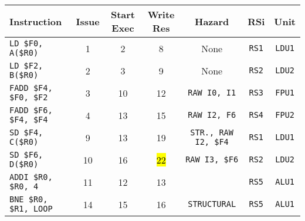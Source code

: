 \begin{enumerate}
    \begin{table}[!htp]
        \centering
        \begin{adjustbox}{width={\textwidth},totalheight={\textheight},keepaspectratio}
        \begin{tabular}{@{} l c c c c c c @{}}
            \toprule
            \textbf{Instruction} & \textbf{Issue} & \textbf{Start Exec} & \textbf{Write Res} & \textbf{Hazard} & \textbf{RSi} & \textbf{Unit} \\
            \midrule
            \texttt{LD \$F0, A(\$R0)}       & 1 & 2 & 8 & None  & \texttt{RS1}   & \texttt{LDU1}  \\ [.5em]
            \texttt{LD \$F2, B(\$R0)}       & 2 & 3 & 9 & None  & \texttt{RS2}   & \texttt{LDU2}  \\ [.5em]
            \texttt{FADD \$F4, \$F0, \$F2}  & 3 & 10 & 12 & \texttt{RAW I0, I1} & \texttt{RS3} & \texttt{FPU1} \\ [.5em]
            \texttt{FADD \$F6, \$F4, \$F4}  & 4 & 13 & 15 & \texttt{RAW I2, F6} & \texttt{RS4} & \texttt{FPU2} \\ [.5em]
            \texttt{SD \$F4, C(\$R0)}       & 9 & 13 & 19 & \texttt{STR., RAW I2, \$F4} & \texttt{RS1} & \texttt{LDU1} \\ [.5em]
            \texttt{SD \$F6, D(\$R0)}       & 10 & 16 & \hl{22} & \texttt{RAW I3, \$F6} & \texttt{RS2} & \texttt{LDU2} \\ [.5em]
            \texttt{ADDI \$R0, \$R0, 4}     & 11 & 12 & 13 &       & \texttt{RS5} & \texttt{ALU1} \\ [.5em]
            \texttt{BNE \$R0, \$R1, LOOP}   & 14 & 15 & 16 & \texttt{STRUCTURAL} & \texttt{RS5} & \texttt{ALU1} \\
            \bottomrule
        \end{tabular}
        \end{adjustbox}
    \end{table}
    

\end{enumerate}
